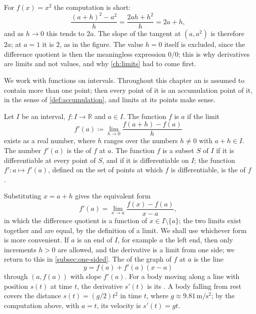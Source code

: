 For $f(x)=x^2$ the computation is short:
\[
\frac{(a+h)^2-a^2}{h}=\frac{2ah+h^2}{h}=2a+h ,
\]
and as $h\to0$ this tends to $2a$. The slope of the tangent at $(a,a^2)$ is therefore $2a$; at $a=1$ it is $2$, as in the figure. The value $h=0$ itself is excluded, since the difference quotient is then the meaningless expression $0/0$; this is why derivatives are limits and not values, and why \cref{ch:limits} had to come first.

We work with functions on intervals. Throughout this chapter an  is assumed to contain more than one point; then every point of it is an accumulation point of it, in the sense of \cref{def:accumulation}, and limits at its points make sense.

\begin{definition}[Derivative]
\label{def:derivative}
Let $I$ be an interval, $f\colon I\to\mathbb R$ and $a\in I$. The function $f$ is  $a$ if the limit
\begin{equation}
f'(a)\coloneqq\lim_{h\to0}\frac{f(a+h)-f(a)}{h}
\label{eq:derivative}
\end{equation}
exists as a real number, where $h$ ranges over the numbers $h\ne0$ with $a+h\in I$. The number $f'(a)$ is the  of $f$ at $a$. The function $f$ is  a subset $S$ of $I$ if it is differentiable at every point of $S$, and  if it is differentiable on $I$; the function $f'\colon a\mapsto f'(a)$, defined on the set of points at which $f$ is differentiable, is the  of $f$.
\end{definition}

Substituting $x=a+h$ gives the equivalent form
\begin{equation}
f'(a)=\lim_{x\to a}\frac{f(x)-f(a)}{x-a},
\label{eq:derivative-x}
\end{equation}
in which the difference quotient is a function of $x\in I\setminus\{a\}$; the two limits exist together and are equal, by the definition of a limit. We shall use whichever form is more convenient. If $a$ is an end of $I$, for example $a$ the left end, then only increments $h>0$ are allowed, and the derivative is a limit from one side; we return to this in \cref{subsec:one-sided}. The  of the graph of $f$ at $a$ is the line
\[
y=f(a)+f'(a)(x-a)
\]
through $(a,f(a))$ with slope $f'(a)$. For a body moving along a line with position $s(t)$ at time $t$, the derivative $s'(t)$ is its . A body falling from rest covers the distance $s(t)=(g/2)t^2$ in time $t$, where $g\approx9.81\,\mathrm{m/s^2}$; by the computation above, with $a=t$, its velocity is $s'(t)=gt$.

